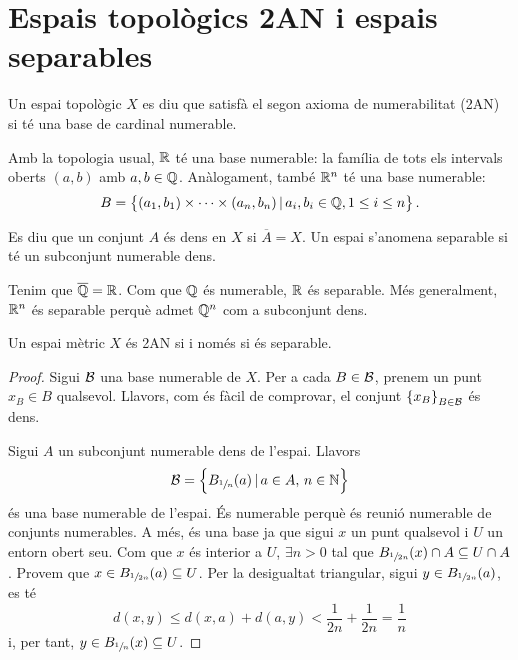 \section{Espais topològics 2AN i espais separables}

\begin{defi}
    Un espai topològic $X$ es diu que satisfà el segon axioma de numerabilitat (2AN) si té una base de cardinal numerable.
\end{defi}

\begin{example}
    Amb la topologia usual, $\mathbb{R}$ t\'e una base numerable: la fam\'ilia de tots els intervals oberts $(a, b)$ amb $a, b \in \mathbb{Q}$. An\`alogament, també $\mathbb{R}^n$ té una base numerable:
    \[B=\left\{(a_1,b_1)\times\dots\times(a_n,b_n)\,|\,a_i, b_i\in \mathbb{Q}, 1\leq i\leq n\right\}. \]
\end{example}

\begin{defi}
    Es diu que un conjunt $A$ és dens en $X$ si $\overline{A} = X$. Un espai s'anomena separable si té un subconjunt numerable dens.
\end{defi}

\begin{example}
    Tenim que $\overline{\mathbb{Q}} = \mathbb{R}$. Com que $\mathbb{Q}$ és numerable, $\mathbb{R}$ és separable. Més generalment, $\mathbb{R}^n$ és separable perquè admet $\mathbb{Q}^n$ com a subconjunt dens.
\end{example}

\begin{prop}
    Un espai mètric $X$ és 2AN si i només si és separable.
\end{prop}
\begin{proof}
    Sigui $\mathcal{B}$ una base numerable de $X$. Per a cada $B \in \mathcal{B}$, prenem un punt $x_B \in B$ qualsevol. Llavors, com és fàcil de comprovar, el conjunt $\left\{x_B\right\}_{B \in \mathcal{B}}$ és dens.
    
    \quad
    
    Sigui $A$ un subconjunt numerable dens de l'espai. Llavors
    \[\mathcal{B} = \left\{B_{\sfrac{1}{n}} (a) \, | \, a\in A, \, n\in \mathbb{N}\right\}\]
    és una base numerable de l'espai. És numerable perquè és reunió numerable de conjunts numerables. A més, és una base ja que sigui $x$ un punt qualsevol i $U$ un entorn obert seu. Com que $x$ és interior a $U$, $\exists n>0$ tal que $B_{\sfrac{1}{2n}}(x)\cap A\subseteq U\cap A$. Provem que $x \in B_{\sfrac{1}{2n}}(a)\subseteq U$. Per la desigualtat triangular, sigui $y \in B_{\sfrac{1}{2n}}(a)$, es té
    \[d(x, y) \leq d(x, a) + d(a, y) < \frac{1}{2n} + \frac{1}{2n} = \frac{1}{n}\]
    i, per tant, $y\in B_{\sfrac{1}{n}}(x) \subseteq U$.
\end{proof}

